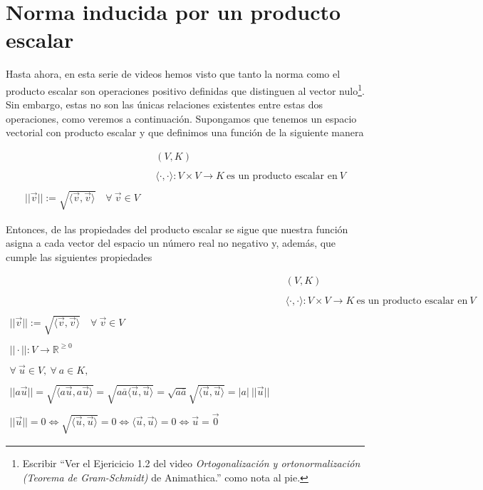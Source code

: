 \documentclass[12pt,dvipsnames]{article}
\numberwithin{equation}{section}
\begin{document}

\section{Norma inducida por un producto escalar} %

Hasta ahora, en esta serie de videos hemos visto que tanto la norma como el producto escalar son operaciones positivo definidas que distinguen al vector nulo\footnote{Escribir ``Ver el Ejericicio 1.2 del video \emph{Ortogonalización y ortonormalización (Teorema de Gram-Schmidt)} de Animathica.'' como nota al pie.}. Sin embargo, estas no son las únicas relaciones existentes entre estas dos operaciones, como veremos a continuación. Supongamos que tenemos un espacio vectorial con producto escalar y que definimos una función de la siguiente manera

\begin{align*}
    & &(V,K) \\
    \\
    & &\langle \cdot , \cdot \rangle : V\times V\to K \ \text{es un producto escalar en} \ V\\
    \\
    ||\vec{v}||:=\sqrt{\langle \vec{v} , \vec{v} \rangle} \quad \forall \ \vec{v}\in V
\end{align*}

\noindent Entonces, de las propiedades del producto escalar se sigue que nuestra función asigna a cada vector del espacio un número real no negativo y, además, que cumple las siguientes propiedades

\begin{align*}
    & &(V,K) \\
    \\
    & &\langle \cdot , \cdot \rangle : V\times V\to K \ \text{es un producto escalar en} \ V\\
    \\
    ||\vec{v}||:=\sqrt{\langle \vec{v} , \vec{v} \rangle} \quad \forall \ \vec{v}\in V\\
    \\
    ||\cdot||:V\to \mathbb{R}^{\ge0}\\
    \\
    \forall \ \vec{u}\in V, \ \forall \ a\in K,\\
    \\
    ||a\vec{u}|| = \sqrt{\langle a\vec{u} , a\vec{u} \rangle} = \sqrt{a\overline{a}\langle \vec{u} , \vec{u} \rangle} = \sqrt{a\overline{a}} \sqrt{\langle \vec{u} , \vec{u} \rangle} = |a| \ ||\vec{u}||\\
    \\
    ||\vec{u}|| = 0 \iff \sqrt{\langle \vec{u} , \vec{u} \rangle} = 0 \iff \langle \vec{u} , \vec{u} \rangle = 0 \iff \vec{u} = \vec{0}
\end{align*}
\end{document}
